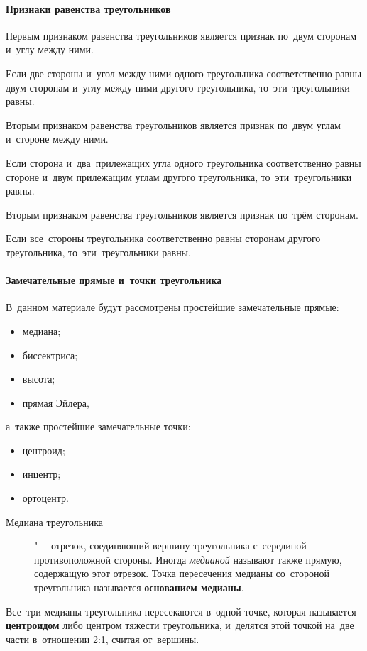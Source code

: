 \documentclass[]{scrartcl}
\begin{document}
\paragraph{Признаки равенства треугольников}
Первым признаком равенства треугольников является признак по~двум сторонам и~углу между ними.
\begin{theorem}
	Если две стороны и~угол между ними одного треугольника соответственно равны двум сторонам и~углу между ними другого треугольника, то~эти~треугольники равны.
\end{theorem}
Вторым признаком равенства треугольников является признак по~двум углам и~стороне между ними.
\begin{theorem}
	Если сторона и~два~прилежащих угла одного треугольника соответственно равны стороне и~двум прилежащим углам другого треугольника, то~эти~треугольники равны.
\end{theorem}
Вторым признаком равенства треугольников является признак по~трём сторонам.
\begin{theorem}
	Если все~стороны треугольника соответственно равны сторонам другого треугольника, то~эти~треугольники равны.
\end{theorem}

\paragraph{Замечательные прямые и~точки треугольника}
В~данном материале будут рассмотрены простейшие замечательные прямые:
\begin{itemize}
	\item медиана;
	\item биссектриса;
	\item высота;
	\item прямая Эйлера,
\end{itemize}
а~также простейшие замечательные точки:
\begin{itemize}
	\item центроид;
	\item инцентр;
	\item ортоцентр.
\end{itemize}

\begin{description}
	\item[Медиана треугольника] "--- отрезок, соединяющий вершину треугольника с~серединой противоположной стороны. Иногда \emph{медианой} называют также прямую, содержащую этот отрезок. Точка пересечения медианы со~стороной треугольника называется \textbf{основанием медианы}.
\end{description}
Все~три медианы треугольника пересекаются в~одной точке, которая называется \textbf{центроидом} либо центром тяжести треугольника, и~делятся этой точкой на~две части в~отношении 2:1, считая от~вершины.
\end{document}
